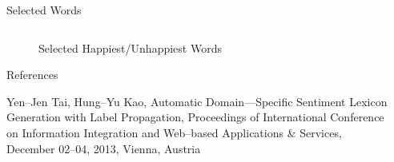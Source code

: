 \documentclass[final]{beamer}
\newlength{\sepwid}
\newlength{\onecolwid}
\begin{document}
\begin{frame}[t]
\begin{columns}[t]
\begin{column}{\onecolwid}
\begin{block}{Selected Words}
\begin{figure}[h]
\begin{center}
{\begin{tabular}{ | l | c | r | }
    \hline
    
  \end{tabular}}

\end{center}
  \caption{Selected Happiest/Unhappiest Words}

\end{figure}


\end{block}




\begin{block}{References}
\small{Yen--Jen Tai, Hung--Yu Kao, Automatic Domain---Specific Sentiment Lexicon Generation with Label Propagation, Proceedings of International Conference on Information Integration and Web--based Applications \& Services, December 02--04, 2013, Vienna, Austria

}

\end{block}












\end{column} %
\begin{column}{\sepwid}\end{column} %

\end{columns} %


\end{frame}
\end{document}
